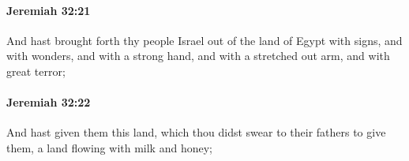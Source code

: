 		\paragraph{Jeremiah 32:21} %
			\label{JEREMIAH-32-21}

			And hast brought forth thy people Israel out of the land of Egypt with signs, and with wonders, and with a strong hand, and with a stretched out arm, and with great terror;


		\paragraph{Jeremiah 32:22} %
			\label{JEREMIAH-32-22}

			And hast given them this land, which thou didst swear to their fathers to give them, a land flowing with milk and honey;



